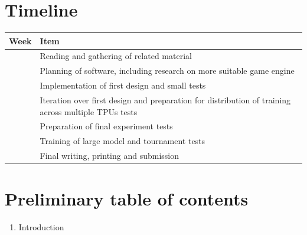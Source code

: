 \documentclass{../lib/llncs}
\begin{document}
\section{Timeline}
\begin{table}
  \begin{center}
    \begin{tabularx}{\textwidth}{ | X | X | }
      \hline
      Week    & Item                                                                                                 \\
      \hline
      [-2, 1) & Foundational courses on usage of tensorflow and notation in RL                                       \\
      \hline
      [1, 2]  & Reading and gathering of related material                                                            \\
      \hline
      [3 - 4] & Planning of software, including research on more suitable game engine                                \\
      \hline
      [5]     & Implementation of first design and small tests                                                       \\
      \hline
      [6]     & Iteration over first design and preparation for distribution of training across multiple TPUs  tests \\
      \hline
      [7]     & Preparation of final experiment   tests                                                              \\
      \hline
      [8 - 9] & Training of large model and tournament   tests                                                       \\
      \hline
      [10-12] & Final writing, printing and submission                                                               \\
      \hline
    \end{tabularx}
  \end{center}
  \label{timetable}
\end{table}

\section{Preliminary table of contents}
\begin{enumerate}
  \item Introduction
\end{enumerate}

\newpage
\appendix
\end{document}
